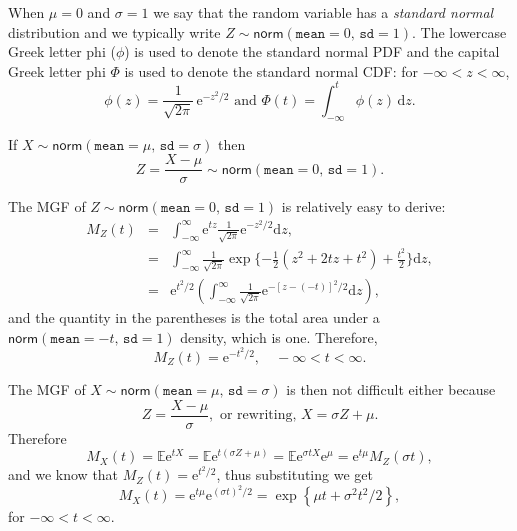 \documentclass[captions=tableheading]{scrbook}
\begin{document}
When \(\mu=0\) and \(\sigma=1\) we say that the random variable has a \emph{standard normal} distribution and we typically write \(Z\sim\mathsf{norm}(\mathtt{mean}=0,\,\mathtt{sd}=1)\). The lowercase Greek letter phi (\(\phi\)) is used to denote the standard normal PDF and the capital Greek letter phi \(\Phi\) is used to denote the standard normal CDF: for \(-\infty<z<\infty\),
\begin{equation}
\phi(z)=\frac{1}{\sqrt{2\pi}}\,\mathrm{e}^{-z^{2}/2}\mbox{ and }\Phi(t)=\int_{-\infty}^{t}\phi(z)\,\mathrm{d} z.
\end{equation}

\begin{prop}
If \(X\sim\mathsf{norm}(\mathtt{mean}=\mu,\,\mathtt{sd}=\sigma)\) then
\begin{equation}
Z=\frac{X-\mu}{\sigma}\sim\mathsf{norm}(\mathtt{mean}=0,\,\mathtt{sd}=1).
\end{equation}
\end{prop}

The MGF of \(Z\sim\mathsf{norm}(\mathtt{mean}=0,\,\mathtt{sd}=1)\) is relatively easy to derive:
\begin{eqnarray*}
M_{Z}(t) & = & \int_{-\infty}^{\infty}\mathrm{e}^{tz}\frac{1}{\sqrt{2\pi}}\mathrm{e}^{-z^{2}/2}\mathrm{d} z,\\
 & = & \int_{-\infty}^{\infty}\frac{1}{\sqrt{2\pi}}\exp \{ -\frac{1}{2}\left(z^{2}+2tz+t^{2}\right)+\frac{t^{2}}{2} \} \mathrm{d} z,\\
 & = & \mathrm{e}^{t^{2}/2}\left(\int_{-\infty}^{\infty}\frac{1}{\sqrt{2\pi}}\mathrm{e}^{-[z-(-t)]^{2}/2}\mathrm{d} z\right),
\end{eqnarray*}
and the quantity in the parentheses is the total area under a \(\mathsf{norm}(\mathtt{mean}=-t,\,\mathtt{sd}=1)\) density, which is one. Therefore,
\begin{equation}
M_{Z}(t)=\mathrm{e}^{-t^{2}/2},\quad-\infty<t<\infty.
\end{equation}

\begin{example}
The MGF of \(X\sim\mathsf{norm}(\mathtt{mean}=\mu,\,\mathtt{sd}=\sigma)\) is then not difficult either because 
\[
Z=\frac{X-\mu}{\sigma},\mbox{ or rewriting, }X=\sigma Z+\mu.
\]
Therefore
\[
M_{X}(t)=\mathbb{E}\mathrm{e}^{tX}=\mathbb{E}\mathrm{e}^{t(\sigma Z+\mu)}=\mathbb{E}\mathrm{e}^{\sigma tX}\mathrm{e}^{\mu}=\mathrm{e}^{t\mu}M_{Z}(\sigma t),
\]
and we know that \(M_{Z}(t)=\mathrm{e}^{t^{2}/2}\), thus substituting we get
\[
M_{X}(t)=\mathrm{e}^{t\mu}\mathrm{e}^{(\sigma t)^{2}/2}=\exp\left\{ \mu t+\sigma^{2}t^{2}/2\right\} ,
\]
for \(-\infty<t<\infty\).
\end{example}
\end{document}
